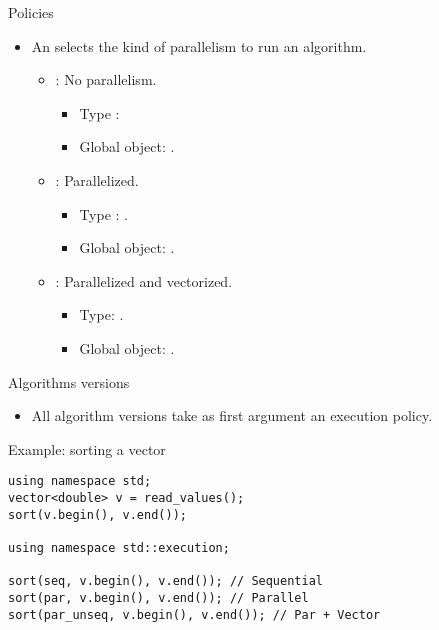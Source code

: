 \begin{frame}[t]{Policies}
\begin{itemize}
  \item An 
        selects the kind of parallelism to run an algorithm.
    \begin{itemize}

      \vfill\pause
      \item {}: No parallelism.
        \begin{itemize}
          \item Type : 
          \item Global object: .
        \end{itemize}

      \vfill\pause
      \item {}: Parallelized.
        \begin{itemize}
          \item Type : .
          \item Global object: .
        \end{itemize}

      \vfill\pause
      \item {}: Parallelized and vectorized.
        \begin{itemize}
          \item Type: .
          \item Global object: .
        \end{itemize}
    \end{itemize}
\end{itemize}
\end{frame}

\begin{frame}[t,fragile]{Algorithms versions}
\begin{itemize}
  \item All algorithm versions take as first argument an execution policy.
\end{itemize}
\begin{block}{Example: sorting a vector}
\begin{lstlisting}[]
using namespace std;
vector<double> v = read_values();
sort(v.begin(), v.end());

using namespace std::execution;

sort(seq, v.begin(), v.end()); // Sequential
sort(par, v.begin(), v.end()); // Parallel
sort(par_unseq, v.begin(), v.end()); // Par + Vector
\end{lstlisting}
\end{block}
\end{frame}

